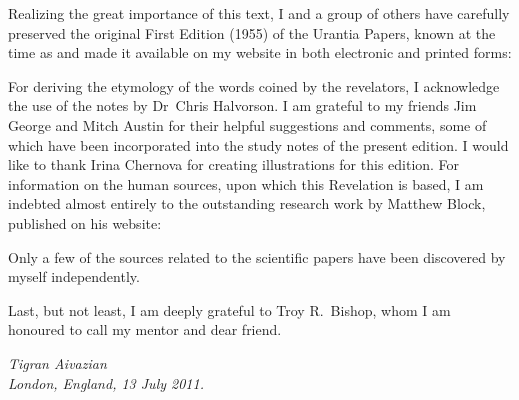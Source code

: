 Realizing the great importance of this text, I and a group of others have carefully preserved
the original First Edition (1955) of the Urantia Papers, known at the time as 
and made it available on my website in both electronic and printed forms:
\begin{center}
\end{center}
For deriving the etymology of the words coined by the revelators, I acknowledge the use of the notes by Dr~Chris Halvorson.
I am grateful to my friends Jim George and Mitch Austin for their helpful suggestions and comments,
some of which have been incorporated into the study notes of the present edition.
I would like to thank Irina Chernova for creating illustrations for this edition.
For information on the human sources, upon which this Revelation is based, I am indebted almost entirely to the outstanding
research work by Matthew Block, published on his website:
\begin{center}
\end{center}
Only a few of the sources related to the scientific papers have been discovered by myself independently.

Last, but not least, I am deeply grateful to Troy R.~Bishop, whom I am honoured to call my mentor and dear friend.


\begin{flushleft}
\itshape
Tigran Aivazian\\
London, England, 13 July 2011.\\
\end{flushleft}
